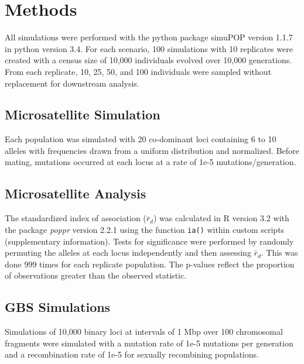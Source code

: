 \documentclass[double,12pt]{beavtex}
\begin{document}
  \section{Methods}\label{methods}
  
  All simulations were performed with the python package simuPOP version
  1.1.7 in python version 3.4. For each scenario, 100 simulations with 10
  replicates were created with a census size of 10,000 individuals evolved
  over 10,000 generations. From each replicate, 10, 25, 50, and 100
  individuals were sampled without replacement for downstream analysis.
  
  \subsection{Microsatellite Simulation}\label{microsatellite-simulation}
  
  Each population was simulated with 20 co-dominant loci containing 6 to
  10 alleles with frequencies drawn from a uniform distribution and
  normalized. Before mating, mutations occurred at each locus at a rate of
  1e-5 mutations/generation.
  
  \subsection{Microsatellite Analysis}\label{microsatellite-analysis}
  
  The standardized index of association (\(\bar{r}_d\)) was calculated in
  R version 3.2 with the package \emph{poppr} version 2.2.1 using the
  function \texttt{ia()} within custom scripts (supplementary
  information). Tests for significance were performed by randomly
  permuting the alleles at each locus independently and then assessing
  \(\bar{r}_d\). This was done 999 times for each replicate population.
  The p-values reflect the proportion of observations greater than the
  observed statistic.
  
  \subsection{GBS Simulations}\label{gbs-simulations}
  
  Simulations of 10,000 binary loci at intervals of 1 Mbp over 100
  chromosomal fragments were simulated with a mutation rate of 1e-5
  mutations per generation and a recombination rate of 1e-5 for sexually
  recombining populations.
  
  \backmatter
  
\end{document}
